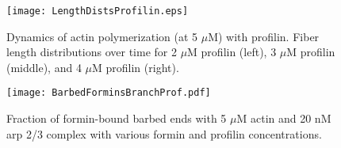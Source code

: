 \documentclass[11pt]{article}
\begin{document}
\begin{appendices}
\begin{figure}
\centering
\texttt{[image: LengthDistsProfilin.eps]}
\caption{\label{fig:ActinProfilin}Dynamics of actin polymerization (at 5 $\mu$M) with profilin. Fiber length distributions over time for 2 $\mu$M profilin (left), 3 $\mu$M profilin (middle), and 4 $\mu$M profilin (right).}
\end{figure}

\begin{figure}
\centering
\texttt{[image: BarbedForminsBranchProf.pdf]}
\caption{\label{fig:FracForBarb} Fraction of formin-bound barbed ends with 5 $\mu$M actin and 20 nM arp 2/3 complex with various formin and profilin concentrations. }
\end{figure}


\end{appendices}






\end{document}
